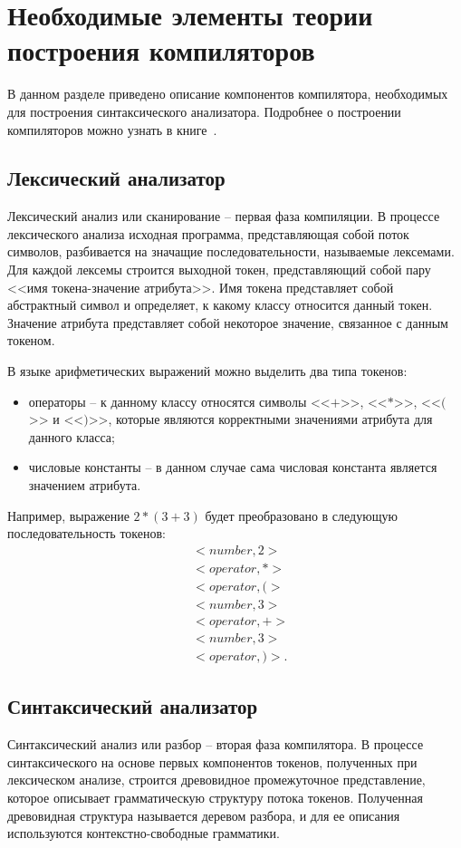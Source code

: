 \section{Необходимые элементы теории построения компиляторов}
В данном разделе приведено описание компонентов компилятора, необходимых для построения синтаксического анализатора.
Подробнее о построении компиляторов можно узнать в книге~\cite{dragon}.
\subsection{Лексический анализатор}
Лексический анализ или сканирование -- первая фаза компиляции.
В процессе лексического анализа исходная программа, представляющая собой поток символов, разбивается на значащие последовательности, называемые лексемами.
Для каждой лексемы строится выходной токен, представляющий собой пару  <<имя токена-значение атрибута>>.
Имя токена представляет собой абстрактный символ и определяет, к какому классу относится данный токен.
Значение атрибута представляет собой некоторое значение, связанное с данным токеном.

В языке арифметических выражений можно выделить два типа токенов:
\begin{itemize}
    \item операторы -- к данному классу относятся символы <<$+$>>, <<$*$>>, <<$($>> и <<$)$>>, которые являются корректными значениями атрибута для данного класса;
    \item числовые константы -- в данном случае сама числовая константа является значением атрибута.
\end{itemize}
Например, выражение $2 * (3 + 3)$ будет преобразовано в следующую последовательность токенов:
\begin{align*}
&<number, 2>\\&<operator, *>\\&<operator, (>\\&<number, 3>\\&<operator, +>\\&<number, 3>\\&<operator, )>.
\end{align*}
\subsection{Синтаксический анализатор}
Синтаксический анализ или разбор -- вторая фаза компилятора.
В процессе синтаксического на основе первых компонентов токенов, полученных при лексическом анализе, строится древовидное промежуточное представление,
которое описывает грамматическую структуру потока токенов.
Полученная древовидная структура называется деревом разбора, и для ее описания используются контекстно-свободные грамматики.

